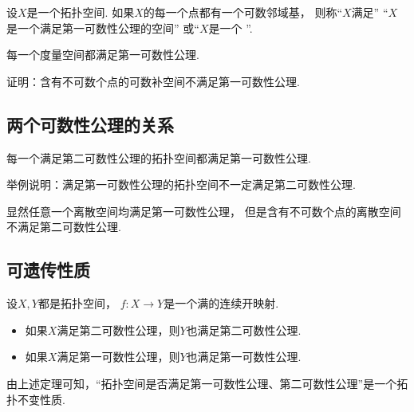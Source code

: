 \begin{definition}
设\(X\)是一个拓扑空间.
如果\(X\)的每一个点都有一个可数邻域基，
则称“\(X\)满足”
“\(X\)是一个满足第一可数性公理的空间”
或“\(X\)是一个 ”.
\end{definition}

\begin{theorem}
每一个度量空间都满足第一可数性公理.
\end{theorem}

\begin{example}
证明：含有不可数个点的可数补空间不满足第一可数性公理.
\end{example}

\subsection{两个可数性公理的关系}
\begin{theorem}
每一个满足第二可数性公理的拓扑空间都满足第一可数性公理.
\end{theorem}

\begin{example}
举例说明：满足第一可数性公理的拓扑空间不一定满足第二可数性公理.
\begin{solution}
显然任意一个离散空间均满足第一可数性公理，
但是含有不可数个点的离散空间不满足第二可数性公理.
\end{solution}
\end{example}

\subsection{可遗传性质}
\begin{theorem}
设\(X,Y\)都是拓扑空间，
\(f\colon X \to Y\)是一个满的连续开映射.
\begin{itemize}
	\item 如果\(X\)满足第二可数性公理，则\(Y\)也满足第二可数性公理.
	\item 如果\(X\)满足第一可数性公理，则\(Y\)也满足第一可数性公理.
\end{itemize}
\end{theorem}
\begin{remark}
由上述定理可知，“拓扑空间是否满足第一可数性公理、第二可数性公理”是一个拓扑不变性质.
\end{remark}


